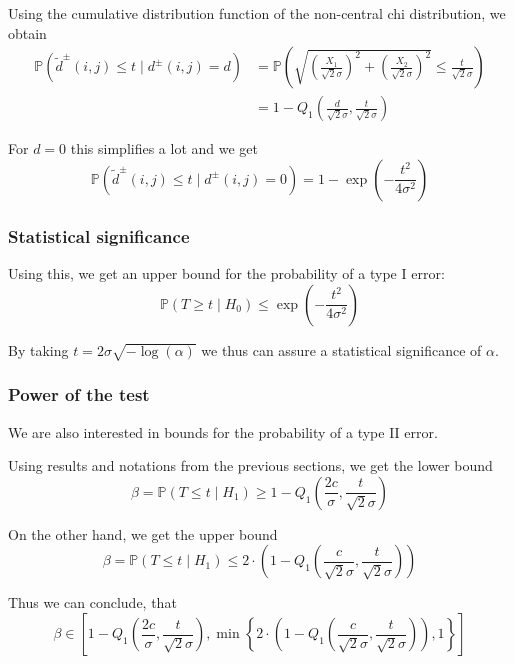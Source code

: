 \documentclass{beamer}
\begin{document}
\begin{frame}
	Using the cumulative distribution function of the non-central chi distribution, we obtain
	\begin{align*}
		\mathbb{P}(\tilde{d}^\pm(i, j) \leq t \mid d^\pm(i, j) = d) &= \mathbb{P}\left( \sqrt{\left( \frac{X_1}{\sqrt{2} \sigma} \right)^2 + \left( \frac{X_2}{\sqrt{2} \sigma} \right)^2} \leq \frac{t}{\sqrt{2} \sigma} \right) \\
		&= 1 - Q_1 \left( \frac{d}{\sqrt{2} \sigma}, \frac{t}{\sqrt{2} \sigma} \right)
	\end{align*}
	
	For $d = 0$ this simplifies a lot and we get
	\begin{equation*}
		\mathbb{P}(\tilde{d}^\pm(i, j) \leq t \mid d^\pm(i, j) = 0) = 1 - \exp \left( - \frac{t^2}{4 \sigma^2} \right)
	\end{equation*}
\end{frame}

\subsubsection{Statistical significance}

\begin{frame}
	Using this, we get an upper bound for the probability of a type I error:
	\begin{equation*}
		\mathbb{P}(T \geq t \mid H_0) \leq \exp \left( - \frac{t^2}{4 \sigma^2} \right)
	\end{equation*}
	
	By taking $t = 2 \sigma \sqrt{- \log(\alpha)}$ we thus can assure a statistical significance of $\alpha$.
\end{frame}

\subsubsection{Power of the test}

\begin{frame}
	We are also interested in bounds for the probability of a type II error.
	
	Using results and notations from the previous sections, we get the lower bound
	\begin{equation*}
		\beta = \mathbb{P}(T \leq t \mid H_1) \geq 1 - Q_1 \left( \frac{2 c}{\sigma}, \frac{t}{\sqrt{2} \sigma} \right)
	\end{equation*}
	
	On the other hand, we get the upper bound
	\begin{equation*}
		\beta = \mathbb{P}(T \leq t \mid H_1) \leq 2 \cdot \left( 1 - Q_1 \left( \frac{c}{\sqrt{2} \sigma}, \frac{t}{\sqrt{2} \sigma} \right) \right)
	\end{equation*}
	
	Thus we can conclude, that
	\begin{equation*}
		\beta \in \left[ 1 - Q_1 \left( \frac{2 c}{\sigma}, \frac{t}{\sqrt{2} \sigma} \right), \min \left\{ 2 \cdot \left( 1 - Q_1 \left( \frac{c}{\sqrt{2} \sigma}, \frac{t}{\sqrt{2} \sigma} \right) \right), 1 \right\} \right]
	\end{equation*}
\end{frame}
\end{document}
